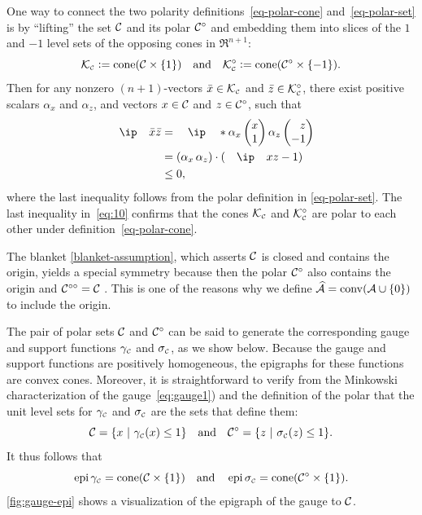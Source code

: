 One way to connect the two polarity definitions~\eqref{eq-polar-cone}
and~\eqref{eq-polar-set} is by ``lifting'' the set $\mathcal{C}$ and its polar
$\mathcal{C}^\circ$ and embedding them into slices of the $1$ and $-1$ level sets of the
opposing cones in $\Re^{n+1}$:
\[
  \mathcal{K}_{\scriptscriptstyle\mathcal{C}} \mathrel{\mathop:}= \operatorname{cone}(\mathcal{C}\times\{1\})
  \hbox{\quad and\quad}
  \mathcal{K}_{\scriptscriptstyle\mathcal{C}}^\circ \mathrel{\mathop:}= \operatorname{cone}(\mathcal{C}^\circ\times\{-1\}).
\]
Then for any nonzero $(n+1)$-vectors $\bar{x}\in\mathcal{K}_{\scriptscriptstyle\mathcal{C}}$ and $\zbar\in\Kscr\Cs\polar$,
there exist positive scalars $\alpha_x$ and $\alpha_z$, and vectors $x\in\mathcal{C}$
and $z\in\mathcal{C}^\circ$, such that
\begin{equation} \label{eq:10} 
\begin{aligned}
  \ip\xbar\zbar
    &= \ip*{\alpha_x\pmat{x\\1}}{\,\alpha_z\pmat{\phantom-z\\-1}}
  \\&= (\alpha_x\,\alpha_z)\cdot(\ip x z - 1)
  \\&\le0,
\end{aligned}
\end{equation}
where the last inequality follows from the polar definition in
\eqref{eq-polar-set}. The last inequality in~\eqref{eq:10}  confirms that the
cones $\mathcal{K}_{\scriptscriptstyle\mathcal{C}}$ and $\mathcal{K}_{\scriptscriptstyle\mathcal{C}}^\circ$ are polar to each other under
definition~\eqref{eq-polar-cone}.

The blanket \autoref{blanket-assumption}, which asserts $\mathcal{C}$ is closed and
contains the origin, yields a special symmetry because then the polar
$\mathcal{C}^\circ$ also contains the origin and $\mathcal{C}^{\circ\circ}=\mathcal{C}$
\cite[Theorem~14.5]{rockafellar1970convex}. This is one of the reasons why we
define $\widehat{\mathcal{A}}=\operatorname{conv}(\mathcal{A}\cup\{0\})$ to include the origin.

The pair of polar sets $\mathcal{C}$ and $\mathcal{C}^\circ$ can be said to generate the
corresponding gauge and support functions $\gamma_{\scriptscriptstyle\mathcal{C}}$ and $\sigma_{\scriptscriptstyle\mathcal{C}}$, as we
show below. Because the gauge and support functions are positively
homogeneous, the epigraphs for these functions
are convex cones. Moreover, it is straightforward to verify from the Minkowski
characterization of the gauge~\eqref{eq:gauge1}) and the definition of the polar that
the unit level sets for $\gamma_{\scriptscriptstyle\mathcal{C}}$ and $\sigma_{\scriptscriptstyle\mathcal{C}}$ are the sets that define
them:
\begin{equation} \label{eq:15}
  \mathcal{C}=\{x~|~\gamma_{\scriptscriptstyle\mathcal{C}}(x)\le1\}
  \hbox{\quad and\quad}
  \mathcal{C}^\circ = \{z~|~\sigma_{\scriptscriptstyle\mathcal{C}}(z)\le1\}.
\end{equation}
It thus follows that
\begin{equation}\label{eq:26} 
  \operatorname{epi}\gamma_{\scriptscriptstyle\mathcal{C}} = \operatorname{cone}(\mathcal{C}\times\{1\})
  \hbox{\quad and\quad}
  \operatorname{epi}\sigma_{\scriptscriptstyle\mathcal{C}} = \operatorname{cone}(\mathcal{C}^\circ\times\{1\}).
\end{equation}
\autoref{fig:gauge-epi} shows a visualization of the epigraph of the gauge to $\mathcal{C}$.

